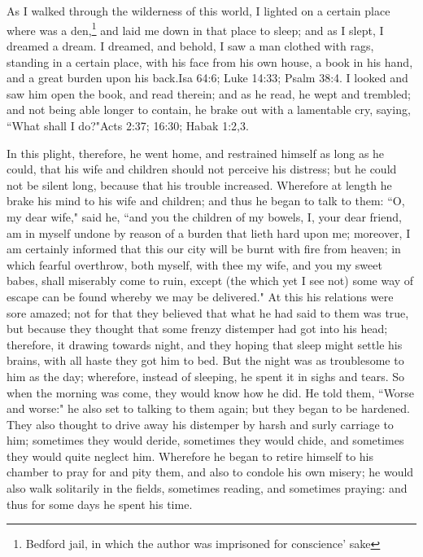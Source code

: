 \chapter[THE FIRST STAGE]{} 
As I walked through the wilderness of this world, I lighted on a certain place where was a den,\footnote{Bedford jail, in which the author was imprisoned for conscience’ sake} and laid me down in that place to sleep; and as I slept, I dreamed a dream. I dreamed, and behold, I saw a man clothed with rags, standing in a certain place, with his face from his own house, a book in his hand, and a great burden upon his back.Isa 64:6; Luke 14:33; Psalm 38:4. I looked and saw him open the book, and read therein; and as he read, he wept and trembled; and not being able longer to contain, he brake out with a lamentable cry, saying, ``What shall I do?"Acts 2:37; 16:30; Habak 1:2,3. 

In this plight, therefore, he went home, and restrained himself as long as he could, that his wife and children should not perceive his distress; but he could not be silent long, because that his trouble increased. Wherefore at length he brake his mind to his wife and children; and thus he began to talk to them: ``O, my dear wife," said he, ``and you the children of my bowels, I, your dear friend, am in myself undone by reason of a burden that lieth hard upon me; moreover, I am certainly informed that this our city will be burnt with fire from heaven; in which fearful overthrow, both myself, with thee my wife, and you my sweet babes, shall miserably come to ruin, except (the which yet I see not) some way of escape can be found whereby we may be delivered." At this his relations were sore amazed; not for that they believed that what he had said to them was true, but because they thought that some frenzy distemper had got into his head; therefore, it drawing towards night, and they hoping that sleep might settle his brains, with all haste they got him to bed. But the night was as troublesome to him as the day; wherefore, instead of sleeping, he spent it in sighs and tears. So when the morning was come, they would know how he did. He told them, ``Worse and worse:" he also set to talking to them again; but they began to be hardened. They also thought to drive away his distemper by harsh and surly carriage to him; sometimes they would deride, sometimes they would chide, and sometimes they would quite neglect him. Wherefore he began to retire himself to his chamber to pray for and pity them, and also to condole his own misery; he would also walk solitarily in the fields, sometimes reading, and sometimes praying: and thus for some days he spent his time. 

